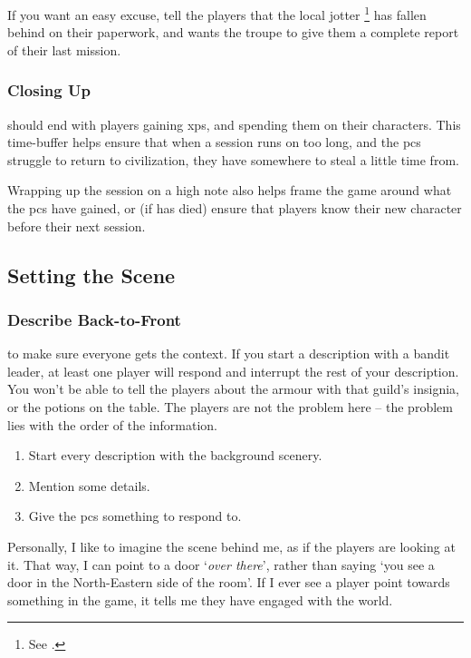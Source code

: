\begin{multicols}{2}
If you want an easy excuse, tell the players that the local \gls{jotter}%
\footnote{See .}
has fallen behind on their paperwork, and wants the troupe to give them a complete report of their last mission.

\subsubsection{Closing Up}
should end with players gaining \glspl{xp}, and spending them on their characters.
This time-buffer helps ensure that when a session runs on too long, and the \glspl{pc} struggle to return to civilization, they have somewhere to steal a little time from.

Wrapping up the session on a high note also helps frame the game around what the \glspl{pc} have gained, or (if  has died) ensure that players know their new character before their next session.

\subsection{Setting the Scene}

\subsubsection{Describe Back-to-Front}
to make sure everyone gets the context.
If you start a description with a bandit leader, at least one player will respond and interrupt the rest of your description.
You won't be able to tell the players about the armour with that guild's insignia, or the potions on the table.
The players are not the problem here -- the problem lies with the order of the information.

\begin{enumerate}
  \item
  Start every description with the background scenery.
  \item
  Mention some details.
  \item
  Give the \glspl{pc} something to respond to.
\end{enumerate}

Personally, I like to imagine the scene behind me, as if the players are looking at it.
That way, I can point to a door `\emph{over there}', rather than saying `you see a door in the North-Eastern side of the room'.
If I ever see a player point towards something in the game, it tells me they have engaged with the world.


\end{multicols}
